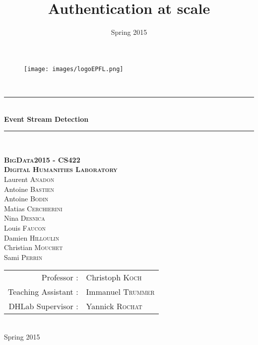 \documentclass[a4paper, 11pt]{article}
\title{Authentication at scale}
\author{ }
\date{Spring 2015}
\newcommand{\HRule}{\rule{\linewidth}{0.5mm}}
\begin{document}

\begin{titlepage}
\begin{center}

\begin{figure}[h] 
\begin{center}
\begin{minipage}[c]{.45\linewidth}
\begin{center}
\texttt{[image: images/logoEPFL.png]}
\end{center}
\end{minipage}
\end{center}
\end{figure}

\hfill \\[2cm]
\HRule \\[0.5cm]
{ \Huge \bfseries Event Stream Detection}\\[0.5cm]

\HRule \\[2cm]
\makeatletter
\renewcommand{\thesection}{\@arabic\c@section}
\makeatother

 
    
\textsc{\textbf{\Large BigData2015 - CS422\\ Digital Humanities Laboratory}}\\[2cm]


\large Laurent \textsc{Anadon}\\
\large Antoine \textsc{Bastien}\\
\large Antoine \textsc{Bodin}\\
\large Matias \textsc{Cerchierini}\\
\large Nina \textsc{Desnica}\\
\large Louis \textsc{Faucon}\\
\large Damien \textsc{Hilloulin}\\
\large Christian \textsc{Mouchet}\\
\large Sami \textsc{Perrin}\\[2cm]


\begin{tabular}{rl}
Professor : &Christoph \textsc{Koch}\\
Teaching Assistant : &Immanuel \textsc{Trummer}\\
DHLab Supervisor : &Yannick \textsc{Rochat}
\end{tabular}

\hfill \\[1cm]
{\large Spring 2015}
\end{center}
\end{titlepage}

\restoregeometry
\tableofcontents
\newpage



\newpage


\newpage


\newpage


\newpage


\newpage



\newpage

 

\end{document}
